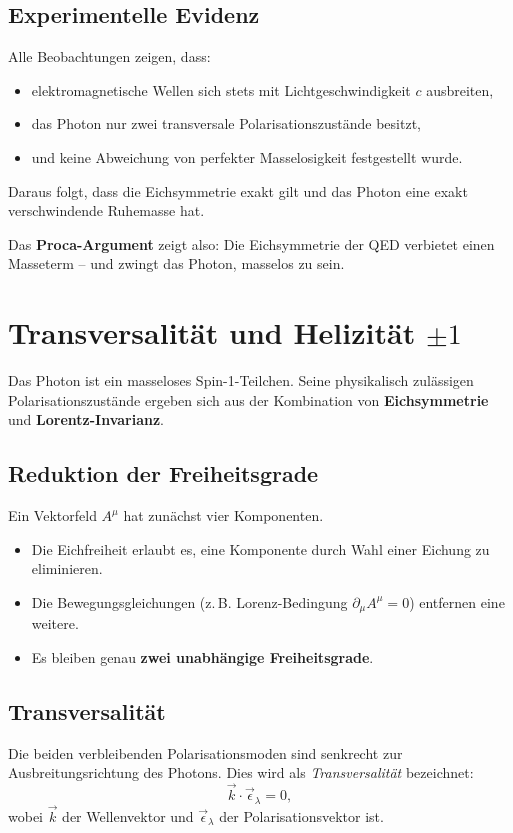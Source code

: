 \subsection*{Experimentelle Evidenz}
Alle Beobachtungen zeigen, dass:
\begin{itemize}
	\item elektromagnetische Wellen sich stets mit Lichtgeschwindigkeit \(c\) ausbreiten,
	\item das Photon nur zwei transversale Polarisationszustände besitzt,
	\item und keine Abweichung von perfekter Masselosigkeit festgestellt wurde.
\end{itemize}
Daraus folgt, dass die Eichsymmetrie exakt gilt 
und das Photon eine exakt verschwindende Ruhemasse hat.

\medskip
Das \textbf{Proca-Argument} zeigt also:  
Die Eichsymmetrie der QED verbietet einen Masseterm – 
und zwingt das Photon, masselos zu sein.
\section{Transversalität und Helizität \( \pm 1 \)}
\label{anhangA:transversalitaet}

Das Photon ist ein masseloses Spin-1-Teilchen. Seine physikalisch
zulässigen Polarisationszustände ergeben sich aus der Kombination
von \textbf{Eichsymmetrie} und \textbf{Lorentz-Invarianz}.

\subsection*{Reduktion der Freiheitsgrade}
Ein Vektorfeld \( A^\mu \) hat zunächst vier Komponenten.
\begin{itemize}
	\item Die Eichfreiheit erlaubt es, eine Komponente durch Wahl 
	einer Eichung zu eliminieren.
	\item Die Bewegungsgleichungen (z.\,B. Lorenz-Bedingung 
	\( \partial_\mu A^\mu = 0 \)) entfernen eine weitere.
	\item Es bleiben genau \textbf{zwei unabhängige Freiheitsgrade}.
\end{itemize}

\subsection*{Transversalität}
Die beiden verbleibenden Polarisationsmoden sind 
senkrecht zur Ausbreitungsrichtung des Photons.  
Dies wird als \emph{Transversalität} bezeichnet:
\[
\vec{k} \cdot \vec{\epsilon}_\lambda = 0,
\]
wobei \( \vec{k} \) der Wellenvektor und 
\( \vec{\epsilon}_\lambda \) der Polarisationsvektor ist.

